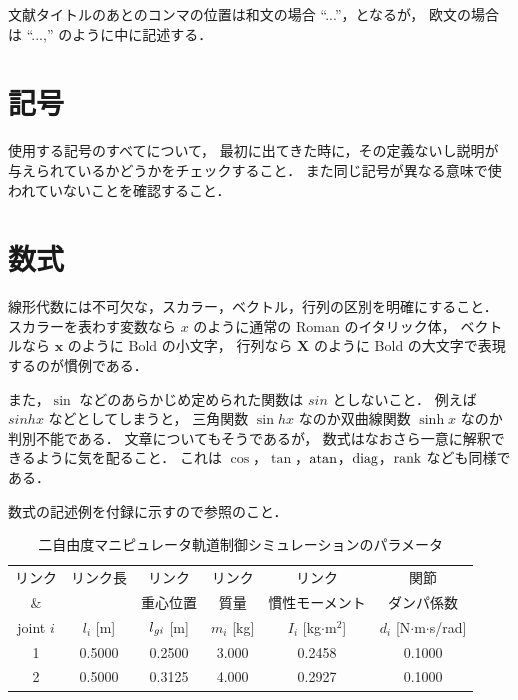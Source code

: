 文献タイトルのあとのコンマの位置は和文の場合 ``...''，となるが，
欧文の場合は ``...,'' のように中に記述する．


\section{記号}

使用する記号のすべてについて，
最初に出てきた時に，その定義ないし説明が与えられているかどうかをチェックすること．
また同じ記号が異なる意味で使われていないことを確認すること．


\section{数式}

線形代数には不可欠な，スカラー，ベクトル，行列の区別を明確にすること．
スカラーを表わす変数なら $x$ のように通常の Roman のイタリック体，
ベクトルなら $\bm{x}$ のように Bold の小文字，
行列なら $\bm{X}$ のように Bold の大文字で表現するのが慣例である．

また，$\sin$ などのあらかじめ定められた関数は $sin$ としないこと．
例えば $sinhx$ などとしてしまうと，
三角関数 $\sin hx$ なのか双曲線関数 $\sinh x$ なのか判別不能である．
文章についてもそうであるが，
数式はなおさら一意に解釈できるように気を配ること．
これは $\cos$，$\tan$，$\mathop{\textrm{atan}}\nolimits$，$\mathop{\textrm{diag}}\nolimits$，$\mathop{\textrm{rank}}\nolimits$ なども同様である．

数式の記述例を付録に示すので参照のこと．


\begin{table}[t]
	\caption{二自由度マニピュレータ軌道制御シミュレーションのパラメータ}							\label{table:c3/parameters}
	\begin{center}
		\small
		\begin{tabular}{|c|c|c|c|c|c|}																								\hline
			リンク		& リンク長	& リンク			& リンク		& リンク					& 関節							\\
			\&			&			& 重心位置			& 質量			& 慣性モーメント			& ダンパ係数					\\
			joint $i$	& $l_i$ [m]	& $l_{\mathit{gi}}$ [m]	& $m_i$ [kg]	& $I_i$ [kg$\cdot$m${}^2$]	& $d_i$ [N$\cdot$m$\cdot$s/rad]	\\ \hline
			1			& 0.5000	& 0.2500			& 3.000			& 0.2458					& 0.1000						\\
			2			& 0.5000	& 0.3125			& 4.000			& 0.2927					& 0.1000						\\ \hline
        \end{tabular}
    \end{center}
\end{table}


